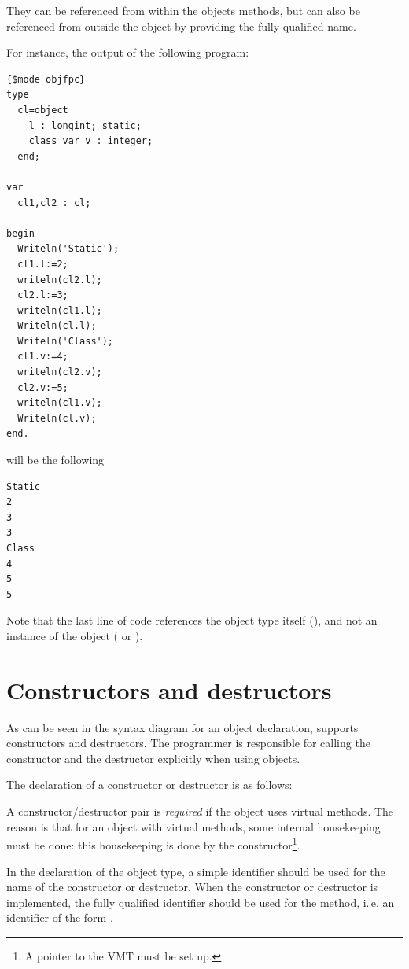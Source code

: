 They can be referenced from within the objects methods, but can also be referenced from
outside the object by providing the fully qualified name.

For instance, the output of the following program:
\begin{verbatim}
{$mode objfpc}
type
  cl=object
    l : longint; static;
    class var v : integer;
  end;

var
  cl1,cl2 : cl;

begin
  Writeln('Static');
  cl1.l:=2;
  writeln(cl2.l);
  cl2.l:=3;
  writeln(cl1.l);
  Writeln(cl.l);
  Writeln('Class');
  cl1.v:=4;
  writeln(cl2.v);
  cl2.v:=5;
  writeln(cl1.v);
  Writeln(cl.v);
end.
\end{verbatim}
will be the following
\begin{verbatim}
Static
2
3
3
Class
4
5
5
\end{verbatim}
Note that the last line of code references the object type itself (),
and not an instance of the object ( or ).


\section{Constructors and destructors }
 
\label{se:constructdestruct}
As can be seen in the syntax diagram for an object declaration, \fpc supports
constructors and destructors. The programmer is responsible for calling the
constructor and the destructor explicitly when using objects.

The declaration of a constructor or destructor is as follows:

A constructor/destructor pair is {\em required} if the object uses virtual methods.
The reason is that for an object with virtual methods, some internal
housekeeping must be done: this housekeeping is done by the
constructor\footnote{A pointer to the VMT must be set up.}.

In the declaration of the object type, a simple identifier should be used
for the name of the constructor or destructor. When the constructor or destructor
is implemented, the fully qualified identifier should be used for the method,
i.\,e. an identifier of the form .

